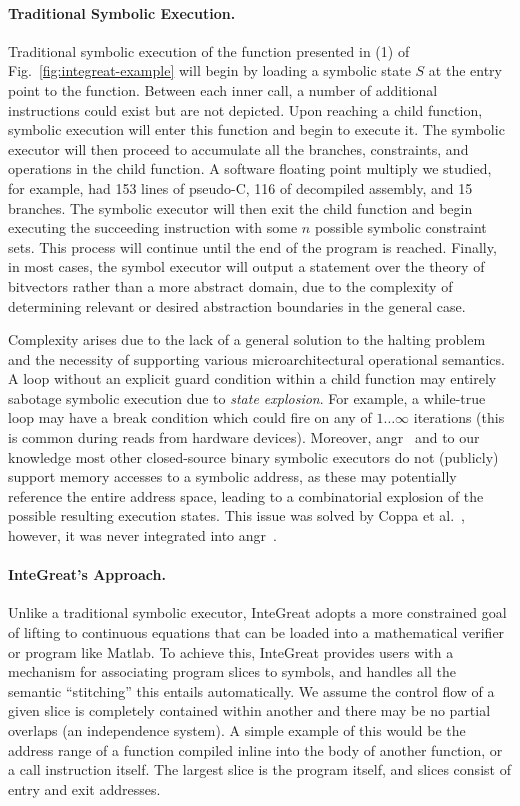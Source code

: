 \paragraph{Traditional Symbolic Execution.}
Traditional symbolic execution of the function presented in (1) of Fig.~\ref{fig:integreat-example} will begin by loading a symbolic state $S$ at the entry point to the function.
Between each inner call, a number of additional instructions could exist but are not depicted.
Upon reaching a child function, symbolic execution will enter this function and begin to execute it.
The symbolic executor will then proceed to accumulate all the branches, constraints, and operations in the child function.
A software floating point multiply we studied, for example, had 153 lines of pseudo-C, 116 of decompiled assembly, and 15 branches.
The symbolic executor will then exit the child function and begin executing the succeeding instruction with some $n$ possible symbolic constraint sets.
This process will continue until the end of the program is reached.
Finally, in most cases, the symbol executor will output a statement over the theory of bitvectors rather than a more abstract domain, due to the complexity of determining relevant or desired abstraction boundaries in the general case.

Complexity arises due to the lack of a general solution to the halting problem and the necessity of supporting various microarchitectural operational semantics.
A loop without an explicit guard condition within a child function may entirely sabotage symbolic execution due to \emph{state explosion}.
For example, a while-true loop may have a break condition which could fire on any of $1\dots\infty$ iterations (this is common during reads from hardware devices).
Moreover, angr~\cite{angr-1} and to our knowledge most other closed-source binary symbolic executors do not (publicly) support memory accesses to a symbolic address, as these may potentially reference the entire address space, leading to a combinatorial explosion of the possible resulting execution states. 
This issue was solved by Coppa et al.~\cite{coppa2017rethinking}, however, it was never integrated into angr~\cite{angr-2}.

\paragraph{InteGreat's Approach.} Unlike a traditional symbolic executor, InteGreat adopts a more constrained goal of lifting to continuous equations that can be loaded into a mathematical verifier or program like Matlab.
To achieve this, InteGreat provides users with a mechanism for associating program slices to symbols, and handles all the semantic ``stitching'' this entails automatically.
We assume the control flow of a given slice is completely contained within another and there may be no partial overlaps (an independence system).
A simple example of this would be the address range of a function compiled inline into the body of another function, or a call instruction itself. 
The largest slice is the program itself, and slices consist of entry and exit addresses.

